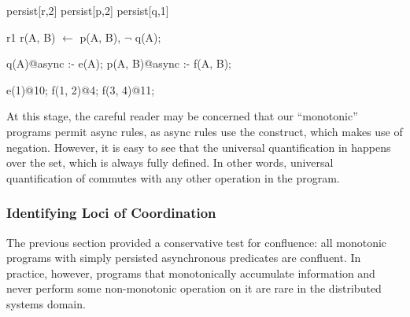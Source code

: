 \begin{Dedalus}
persist[r,2]
persist[p,2]
persist[q,1]

r1
r(A, B) \(\leftarrow\) 
    p(A, B), \(\lnot\) q(A);

q(A)@async :- e(A);
p(A, B)@async :- f(A, B);

e(1)@10;
f(1, 2)@4;
f(3, 4)@11; 
\end{Dedalus} 

At this stage, the careful reader may be concerned that our ``monotonic''
programs permit async rules, as async rules use the  construct,
which makes use of negation.  However, it is easy to see that the universal
quantification in  happens over the  set, which
is always fully defined.  In other words, universal quantification of
 commutes with any other operation in the program.


\subsubsection{Identifying Loci of Coordination}
The previous section provided a conservative test for confluence: all monotonic
programs with simply persisted asynchronous predicates are confluent.  In
practice, however, programs that monotonically accumulate information and never
perform some non-monotonic operation on it are rare in the distributed systems
domain.



